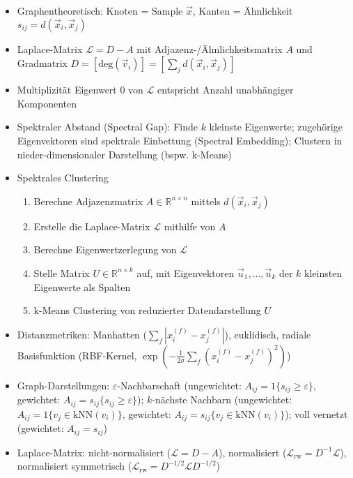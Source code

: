 \documentclass[11pt]{scrartcl}
\begin{document}
\begin{itemize}
    \item Graphentheoretisch: Knoten = Sample $\vec{x}$, Kanten = 
    Ähnlichkeit $s_{ij} = d(\vec{x}_i, \vec{x}_j)$
    \item Laplace-Matrix $\mathcal{L} = D - A$ mit Adjazenz-/Ähnlichkeitsmatrix $A$ und Gradmatrix 
    $D = [\mathrm{deg}(\vec{v}_i)] = [\sum_j d(\vec{x}_i, \vec{x}_j)]$
    \item Multiplizität Eigenwert 0 von $\mathcal{L}$ entspricht Anzahl unabhängiger Komponenten
    \item Spektraler Abstand (Spectral Gap): Finde $k$ kleinste Eigenwerte; zugehörige Eigenvektoren
    sind spektrale Einbettung (Spectral Embedding); Clustern in nieder-dimensionaler Darstellung 
    (bspw. k-Means)
    \item Spektrales Clustering
    \begin{enumerate}
        \item Berechne Adjazenzmatrix $A \in \mathbb{R}^{n \times n}$ mittels $d(\vec{x}_i, 
        \vec{x}_j)$
        \item Erstelle die Laplace-Matrix $\mathcal{L}$ mithilfe von $A$
        \item Berechne Eigenwertzerlegung von $\mathcal{L}$
        \item Stelle Matrix $U \in \mathbb{R}^{n \times k}$ auf, mit Eigenvektoren 
        $\vec{u}_1, \dots, \vec{u}_k$ der $k$ kleinsten Eigenwerte als Spalten
        \item k-Means Clustering von reduzierter Datendarstellung $U$
    \end{enumerate}
    \item Distanzmetriken: Manhatten ($\sum_f |x_i^{(f)} - x_j^{(f)}|$), euklidisch, radiale 
    Basisfunktion (RBF-Kernel, $\exp(-\frac{1}{2 \sigma} \sum_f (x_i^{(f)} - x_j^{(f)})^2)$)
    \item Graph-Darstellungen: $\varepsilon$-Nachbarschaft (ungewichtet: $A_{ij} = 1\{ s_{ij} 
    \geq \varepsilon \}$, gewichtet: $A_{ij} = s_{ij} \{ s_{ij} \geq \varepsilon \}$);
    $k$-nächste Nachbarn (ungewichtet: $A_{ij} = 1\{ v_j \in \mathrm{kNN}(v_i) \}$, 
    gewichtet: $A_{ij} = s_{ij} \{ v_j \in \mathrm{kNN}(v_i) \}$); voll vernetzt (gewichtet: 
    $A_{ij} = s_{ij}$)
    \item Laplace-Matrix: nicht-normalisiert ($\mathcal{L} = D - A$), normalisiert 
    ($\mathcal{L}_\mathrm{rw} = D^{-1} \mathcal{L}$), normalisiert symmetrisch 
    ($\mathcal{L}_\mathrm{rw} = D^{-1/2} \mathcal{L} D^{-1/2}$)

\end{itemize}
\end{document}
